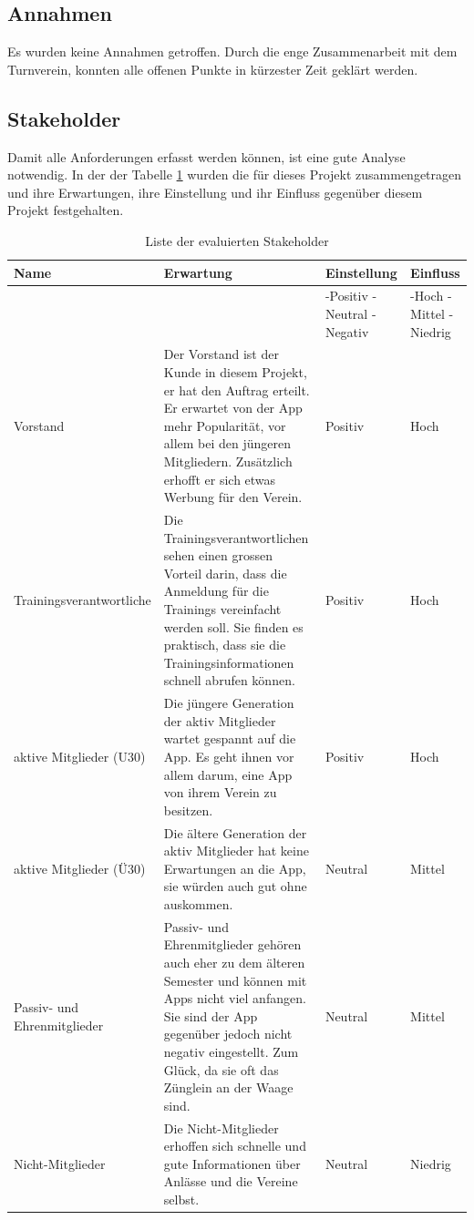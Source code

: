 \FloatBarrier
\subsection{Annahmen}\label{annahmen}
Es wurden keine Annahmen getroffen. Durch die enge Zusammenarbeit mit dem Turnverein, konnten alle offenen Punkte in kürzester Zeit geklärt werden.

\newpage
\subsection{Stakeholder}\label{stakeholder}
Damit alle Anforderungen erfasst werden können, ist eine gute  Analyse notwendig. In der der Tabelle \ref{table:stakeholder} wurden die  für dieses Projekt zusammengetragen und ihre Erwartungen, ihre Einstellung und ihr Einfluss gegenüber diesem Projekt festgehalten.

\begin{table}[ht]
\centering
  \begin{tabular}{ l | p{5cm} | p{1.5cm} | p{1.5cm} }
	\hline
	\rowcolor{darkgray}
	Name							&	Erwartung		&	Einstellung 	&	Einfluss	\\ \hline
	\rowcolor{gray}
								&				&	-Positiv \mbox{-Neutral} \mbox{-Negativ} 	&	-Hoch \mbox{-Mittel} \mbox{-Niedrig} \\ \hline
	Vorstand						&	Der Vorstand ist der Kunde in diesem Projekt, er hat den Auftrag erteilt. Er erwartet von der App mehr Popularität, vor allem bei den jüngeren Mitgliedern. Zusätzlich erhofft er sich etwas Werbung für den Verein.			
												& 	Positiv		&	Hoch		\\ \hline
	Trainingsverantwortliche				&	Die Trainingsverantwortlichen sehen einen grossen Vorteil darin, dass die Anmeldung für die Trainings vereinfacht werden soll. Sie finden es praktisch, dass sie die Trainingsinformationen schnell abrufen können.			
												& 	Positiv		&	Hoch		\\ \hline
	aktive Mitglieder (U30)				&	Die jüngere Generation der aktiv Mitglieder wartet gespannt auf die App. Es geht ihnen vor allem darum, eine App von ihrem Verein zu besitzen.			
												& 	Positiv		&	Hoch		\\ \hline
	aktive Mitglieder (Ü30)				&	Die ältere Generation der aktiv Mitglieder hat keine Erwartungen an die App, sie würden auch gut ohne auskommen. 		
												& 	Neutral	&	Mittel		\\ \hline
	Passiv- und Ehrenmitglieder			&	Passiv- und Ehrenmitglieder gehören auch eher zu dem älteren Semester und können mit Apps nicht viel anfangen. Sie sind der App gegenüber jedoch nicht negativ eingestellt. Zum Glück, da sie oft das Zünglein an der Waage sind.
												& 	Neutral	&	Mittel		\\ \hline
	Nicht-Mitglieder					&	Die Nicht-Mitglieder erhoffen sich schnelle und gute Informationen über Anlässe und die Vereine selbst.
												& 	Neutral	&	Niedrig	\\ \hline
  \end{tabular}
   \caption{Liste der evaluierten Stakeholder}\label{table:stakeholder}
\end{table}

